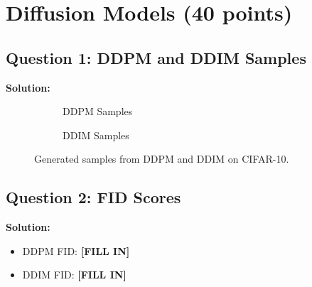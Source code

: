 \documentclass[11pt]{article}
\begin{document}
\section{Diffusion Models (40 points)}

\subsection*{Question 1: DDPM and DDIM Samples}

\textbf{Solution:}

\begin{figure}[H]
  \centering
  \begin{subfigure}[b]{0.48\textwidth}
    \centering
    \fbox{\rule{0pt}{4cm}\rule{0.9\textwidth}{0pt}}
    \caption{DDPM Samples}
  \end{subfigure}
  \hfill
  \begin{subfigure}[b]{0.48\textwidth}
    \centering
    \fbox{\rule{0pt}{4cm}\rule{0.9\textwidth}{0pt}}
    \caption{DDIM Samples}
  \end{subfigure}
  \caption{Generated samples from DDPM and DDIM on CIFAR-10.}
\end{figure}

\subsection*{Question 2: FID Scores}

\textbf{Solution:}
\begin{itemize}
  \item DDPM FID: \textbf{[FILL IN]}
  \item DDIM FID: \textbf{[FILL IN]}
\end{itemize}
\end{document}
